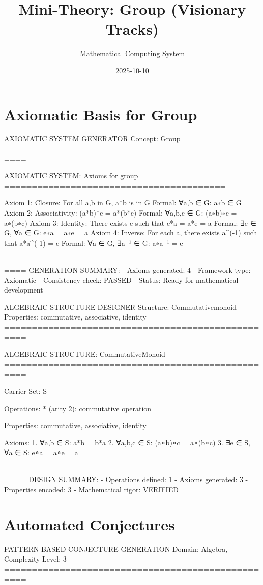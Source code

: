\documentclass{article}
\title{Mini-Theory: Group (Visionary Tracks)}
\author{Mathematical Computing System}
\date{2025-10-10}
\begin{document}
\maketitle


\section{Axiomatic Basis for Group}

AXIOMATIC SYSTEM GENERATOR
Concept: Group
==================================================

AXIOMATIC SYSTEM: Axioms for group
========================================

Axiom 1: Closure: For all a,b in G, a*b is in G
          Formal: ∀a,b ∈ G: a∗b ∈ G
Axiom 2: Associativity: (a*b)*c = a*(b*c)
          Formal: ∀a,b,c ∈ G: (a∗b)∗c = a∗(b∗c)
Axiom 3: Identity: There exists e such that e*a = a*e = a
          Formal: ∃e ∈ G, ∀a ∈ G: e∗a = a∗e = a
Axiom 4: Inverse: For each a, there exists a^(-1) such that a*a^(-1) = e
          Formal: ∀a ∈ G, ∃a⁻¹ ∈ G: a∗a⁻¹ = e

==================================================
GENERATION SUMMARY:
- Axioms generated: 4
- Framework type: Axiomatic
- Consistency check: PASSED
- Status: Ready for mathematical development


ALGEBRAIC STRUCTURE DESIGNER
Structure: Commutativemonoid
Properties: commutative, associative, identity
==================================================

ALGEBRAIC STRUCTURE: CommutativeMonoid
==================================================

Carrier Set: S

Operations:
  * (arity 2): commutative operation

Properties: commutative, associative, identity

Axioms:
  1. ∀a,b ∈ S: a*b = b*a
  2. ∀a,b,c ∈ S: (a∘b)∘c = a∘(b∘c)
  3. ∃e ∈ S, ∀a ∈ S: e∘a = a∘e = a

==================================================
DESIGN SUMMARY:
- Operations defined: 1
- Axioms generated: 3
- Properties encoded: 3
- Mathematical rigor: VERIFIED



\section{Automated Conjectures}

PATTERN-BASED CONJECTURE GENERATION
Domain: Algebra, Complexity Level: 3
==================================================
\end{document}
